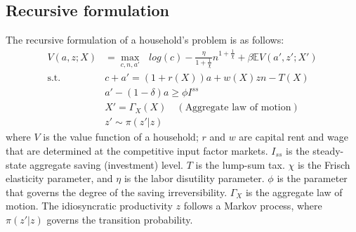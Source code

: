 \subsection*{Recursive formulation}




The recursive formulation of a household's problem is as follows:
\begin{align}
  V(a,z;X) &= \max_{c,n,a'}\text{ } log(c) - \frac{\eta}{1+\frac{1}{\chi}}n^{1+\frac{1}{\chi}}+ \beta \mathbb{E}V(a',z';X')
  \\
  \text{s.t.}\quad& c + a' = (1+r(X))a + w(X)zn - T(X)
  \\
  & a'-(1-\delta)a\geq \phi I^{ss}
  \\
  & X' = \Gamma_{X}(X) \quad(\text{Aggregate law of motion})
  \\
  & z' \sim \pi(z'|z)
\end{align}
where $V$ is the value function of a household; $r$ and $w$ are capital rent and wage that are determined at the competitive input factor markets. 
$I_{ss}$ is the steady-state aggregate saving (investment) level. $T$ is the lump-sum tax.
$\chi$ is the Frisch elasticity parameter, and $\eta$ is the labor disutility parameter.
$\phi$ is the parameter that governs the degree of the saving irreversibility. $\Gamma_{X}$ is the aggregate law of motion. The idiosyncratic productivity $z$ follows a Markov process, where $\pi(z'|z)$ governs the transition probability.
 
